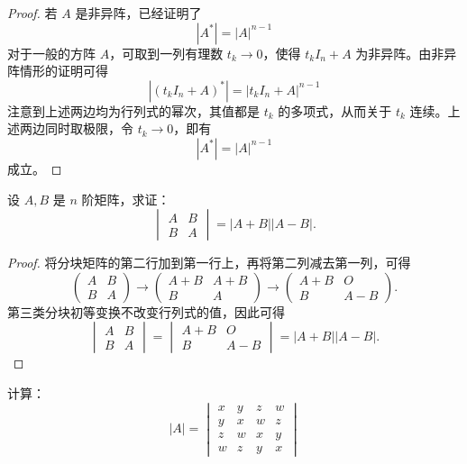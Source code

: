 \documentclass[lang=cn,12pt]{elegantbook}
\begin{document}
\begin{proof}
    若 \( A \) 是非异阵，已经证明了 \[ |A^*| = |A|^{n-1} \]对于一般的方阵 \( A \)，可取到一列有理数 \( t_k \to 0 \)，使得 \( t_k I_n + A \) 为非异阵。由非异阵情形的证明可得
    \[ |(t_k I_n + A)^*| = |t_k I_n + A|^{n-1} \]
    注意到上述两边均为行列式的幂次，其值都是 \( t_k \) 的多项式，从而关于 \( t_k \) 连续。上述两边同时取极限，令 \( t_k \to 0 \)，即有 \[ |A^*| = |A|^{n-1} \] 成立。
\end{proof}

\begin{example}
    设 \( A, B \) 是 \( n \) 阶矩阵，求证：
    \[
    \begin{vmatrix}
    A & B \\
    B & A
    \end{vmatrix} = |A + B||A - B|.
    \]
    \end{example}
    
    \begin{proof}
    将分块矩阵的第二行加到第一行上，再将第二列减去第一列，可得
    \[
    \begin{pmatrix}
    A & B \\
    B & A
    \end{pmatrix} \rightarrow 
    \begin{pmatrix}
    A + B & A + B \\
    B & A
    \end{pmatrix} \rightarrow 
    \begin{pmatrix}
    A + B & O \\
    B & A - B
    \end{pmatrix}.
    \]
    第三类分块初等变换不改变行列式的值，因此可得
    \[
    \begin{vmatrix}
    A & B \\
    B & A
    \end{vmatrix} = 
    \begin{vmatrix}
    A + B & O \\
    B & A - B
    \end{vmatrix} = |A + B||A - B|.
    \]
\end{proof}

\begin{example}
    计算：
    \[
    |A| = 
    \begin{vmatrix}
    x & y & z & w \\
    y & x & w & z \\
    z & w & x & y \\
    w & z & y & x
    \end{vmatrix}
    \]
    \end{example}
    
\end{document}
